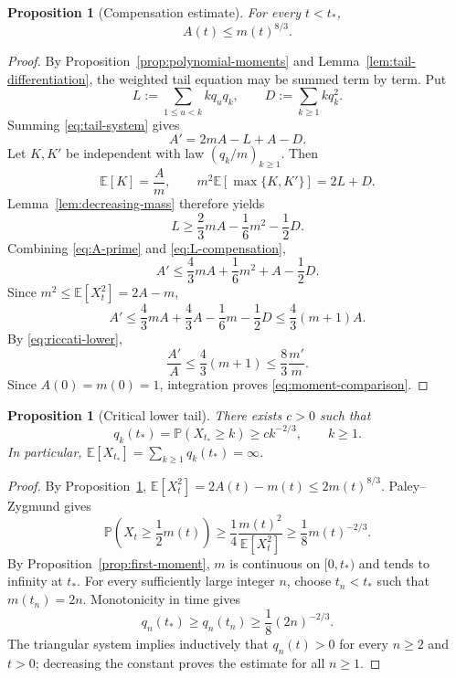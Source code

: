\documentclass[11pt,a4paper]{amsart}
\newtheorem{proposition}[theorem]{Proposition}
\theoremstyle{remark}
\begin{document}
\begin{proposition}[Compensation estimate]
\label{prop:moment-comparison}
For every \(t<t_*\),
\begin{equation}
\label{eq:moment-comparison}
        A(t)\leq m(t)^{8/3}.
\end{equation}
\end{proposition}

\begin{proof}
By Proposition~\ref{prop:polynomial-moments} and
Lemma~\ref{lem:tail-differentiation}, the weighted tail equation may be
summed term by term. Put
\[
        L:=\sum_{1\leq u<k}kq_uq_k,
        \qquad
        D:=\sum_{k\geq1}kq_k^2.
\]
Summing \eqref{eq:tail-system} gives
\begin{equation}
\label{eq:A-prime}
        A'=2mA-L+A-D.
\end{equation}
Let \(K,K'\) be independent with law
\((q_k/m)_{k \geq 1}\). Then
\[
        \mathbb{E}[K]=\frac{A}{m},
        \qquad
        m^2\mathbb{E}[\max\{K,K'\}]=2L+D.
\]
Lemma~\ref{lem:decreasing-mass} therefore yields
\begin{equation}
\label{eq:L-compensation}
        L
        \geq
        \frac23mA-\frac16m^2-\frac12D.
\end{equation}
Combining \eqref{eq:A-prime} and \eqref{eq:L-compensation},
\[
        A'
        \leq
        \frac43mA+\frac16m^2+A-\frac12D.
\]
Since \(m^2\leq\mathbb{E}[X_t^2]=2A-m\),
\[
        A'
        \leq
        \frac43mA+\frac43A-\frac16m-\frac12D
        \leq
        \frac43(m+1)A.
\]
By \eqref{eq:riccati-lower},
\[
        \frac{A'}A
        \leq\frac43(m+1)
        \leq\frac83\frac{m'}m.
\]
Since \(A(0)=m(0)=1\), integration proves
\eqref{eq:moment-comparison}.
\end{proof}

\begin{proposition}[Critical lower tail]
\label{prop:critical-lower-tail}
There exists \(c>0\) such that
\[
        q_k(t_*)=\mathbb{P}(X_{t_*}\geq k)\geq ck^{-2/3},
        \qquad k\geq1.
\]
In particular, \(\mathbb{E}[X_{t_*}] = \sum_{k\geq1}q_k(t_*)=\infty\).
\end{proposition}

\begin{proof}
By Proposition~\ref{prop:moment-comparison},
\(\mathbb{E}[X_t^2]=2A(t)-m(t)\leq2m(t)^{8/3}\). Paley--Zygmund gives
\[
        \mathbb{P}\!\left(X_t\geq\frac12m(t)\right)
        \geq
        \frac14\frac{m(t)^2}{\mathbb{E}[X_t^2]}
        \geq\frac18m(t)^{-2/3}.
\]
By Proposition~\ref{prop:first-moment}, \(m\) is continuous on
\([0,t_*)\) and tends to infinity at \(t_*\). For every sufficiently large
integer \(n\), choose \(t_n<t_*\) such that \(m(t_n)=2n\). Monotonicity in
time gives
\[
        q_n(t_*)\geq q_n(t_n)\geq\frac18(2n)^{-2/3}.
\]
The triangular system implies inductively that \(q_n(t)>0\) for every
\(n\geq2\) and \(t>0\); decreasing the constant proves the estimate for
all \(n\geq1\).
\end{proof}
\end{document}

